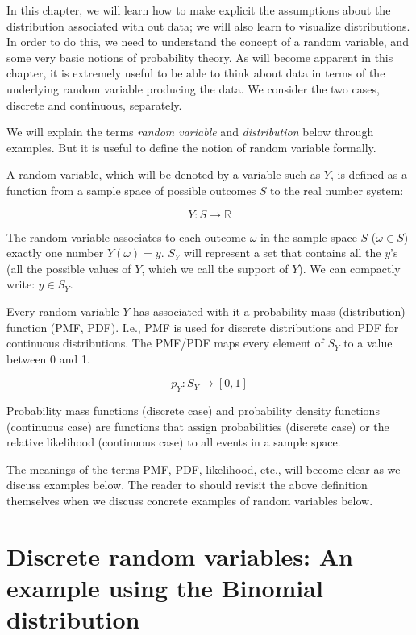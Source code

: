 \documentclass[12pt,]{krantz}
\begin{document}
In this chapter, we will learn how to make explicit the assumptions about the distribution associated with out data; we will also learn to visualize distributions. In order to do this, we need to understand the concept of a random variable, and some very basic notions of probability theory. As will become apparent in this chapter, it is extremely useful to be able to think about data in terms of the underlying random variable producing the data. We consider the two cases, discrete and continuous, separately.

We will explain the terms \emph{random variable} and \emph{distribution} below through examples. But it is useful to define the notion of random variable formally.

A random variable, which will be denoted by a variable such as \(Y\), is defined as a function from a sample space of possible outcomes \(S\) to the real number system:

\begin{equation}
Y : S \rightarrow \mathbb{R}
\end{equation}

The random variable associates to each outcome \(\omega\) in the sample space \(S\) (\(\omega \in S\)) exactly one number \(Y(\omega) = y\). \(S_Y\) will represent a set that contains all the \(y\)'s (all the possible values of \(Y\), which we call the support of \(Y\)). We can compactly write: \(y \in S_Y\).

Every random variable \(Y\) has associated with it a probability mass (distribution) function (PMF, PDF). I.e., PMF is used for discrete distributions and PDF for continuous distributions. The PMF/PDF maps every element of \(S_Y\) to a value between 0 and 1.

\begin{equation}
p_Y : S_Y \rightarrow [0, 1] 
\end{equation}

Probability mass functions (discrete case) and probability density functions (continuous case) are functions that assign probabilities (discrete case) or the relative likelihood (continuous case) to all events in a sample space.

The meanings of the terms PMF, PDF, likelihood, etc., will become clear as we discuss examples below. The reader to should revisit the above definition themselves when we discuss concrete examples of random variables below.

\hypertarget{discrete-random-variables-an-example-using-the-binomial-distribution}{%
\section{Discrete random variables: An example using the Binomial distribution}\label{discrete-random-variables-an-example-using-the-binomial-distribution}}
\end{document}
